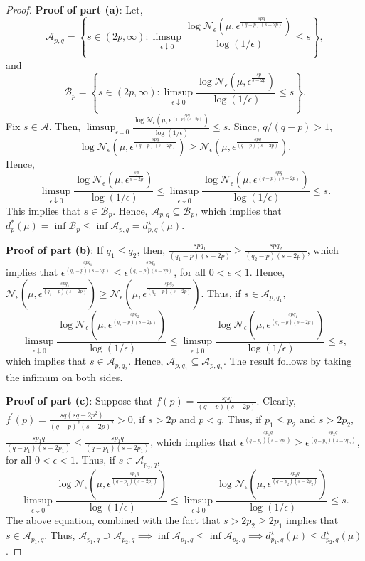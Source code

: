\documentclass[12pts]{article}
\newcommand{\sA}{ \mathscr{A}}
\newcommand{\sB}{ \mathscr{B}}
\newcommand{\sN}{ \mathscr{N}}
\begin{document}
 \begin{proof}
     \textbf{Proof of part (a)}: Let,  \[\sA_{p,q}=  \left\{s \in (2p, \infty) : \limsup_{\epsilon \downarrow 0} \frac{\log \sN_{\epsilon}\left(\mu, \epsilon^{\frac{s p q}{(q-p)(s-2p)}}\right)}{\log(1/\epsilon)} \leq s \right\},\] 
     and \[\sB_{p}=  \left\{s \in (2p, \infty) : \limsup_{\epsilon \downarrow 0} \frac{\log \sN_{\epsilon}\left(\mu, \epsilon^{\frac{s p }{s-2p}}\right)}{\log(1/\epsilon)} \leq s \right\}.\] Fix $s \in \sA$. Then,  $\limsup_{\epsilon \downarrow 0} \frac{\log \sN_{\epsilon}\left(\mu, \epsilon^{\frac{s p q}{(q-p)(s-2p)}}\right)}{\log(1/\epsilon)} \leq s$. Since, $q/(q-p) > 1$, 
     \[\log \sN_{\epsilon}\left(\mu, \epsilon^{\frac{s p q}{(q-p)(s-2p)}}\right) \ge \sN_{\epsilon}\left(\mu, \epsilon^{\frac{s p q}{(q-p)(s-2p)}}\right).\]
     Hence, \[\limsup_{\epsilon \downarrow 0} \frac{\log \sN_{\epsilon}\left(\mu, \epsilon^{\frac{s p }{s-2p}}\right)}{\log(1/\epsilon)} \le \limsup_{\epsilon \downarrow 0} \frac{\log \sN_{\epsilon}\left(\mu, \epsilon^{\frac{s p q}{(q-p)(s-2p)}}\right)}{\log(1/\epsilon)}  \leq s. \]
     This implies that $s \in \sB_p$. Hence, $\sA_{p,q} \subseteq \sB_p$, which implies that $d^\ast_p(\mu) = \inf \sB_p \le \inf \sA_{p,q} = d^\star_{p,q}(\mu)$. 

\textbf{Proof of part (b)}: If $q_1 \le q_2$, then, $\frac{s p q_1}{(q_1-p)(s - 2 p)} \ge \frac{s p q_2}{(q_2-p)(s - 2 p)}$, which implies that $\epsilon^{\frac{s p q_1}{(q_1-p)(s - 2 p)}} \le \epsilon^{\frac{s p q_2}{(q_2-p)(s - 2 p)}}$, for all $0 < \epsilon < 1$. Hence, $\sN_{\epsilon}\left(\mu, \epsilon^{\frac{s p q_1}{(q_1-p)(s-2p)}}\right) \ge \sN_{\epsilon}\left(\mu, \epsilon^{\frac{s p q_2}{(q_2-p)(s-2p)}}\right)$. Thus, if $s \in \sA_{p,q_1}$, 
\[\limsup_{\epsilon \downarrow 0} \frac{\log \sN_{\epsilon}\left(\mu, \epsilon^{\frac{s p q_2}{(q_2-p)(s-2p)}}\right)}{\log(1/\epsilon)} \le  \limsup_{\epsilon \downarrow 0} \frac{\log \sN_{\epsilon}\left(\mu, \epsilon^{\frac{s p q_1}{(q_1-p)(s-2p)}}\right)}{\log(1/\epsilon)} \leq s, \]
which implies that $s \in \sA_{p, q_2}$. Hence, $\sA_{p, q_1} \subseteq \sA_{p, q_2} $. The result follows by taking the infimum on both sides. 

\textbf{Proof of part (c)}:
Suppose that $f(p) = \frac{spq}{\left(q-p\right)\left(s-2p\right)}.$ Clearly, $f^\prime(p) = \frac{sq(sq - 2 p^2)}{(q-p)^2 (s-2p)^2} > 0$, if $s > 2p $ and $p <q $. Thus, if $p_1 \le p_2$ and $s > 2p_2$, $\frac{s p_1 q }{(q-p_1)(s - 2 p_1)} \le \frac{s p_1 q}{(q-p_1)(s - 2 p_1)}$, which implies that $\epsilon^{\frac{s p_1 q}{(q-p_1)(s - 2 p_1)}} \ge \epsilon^{\frac{s p_2 q}{(q-p_2)(s - 2 p_2)}}$, for all $0 < \epsilon < 1$. Thus, if $s \in \sA_{p_2, q}$, 
\[\limsup_{\epsilon \downarrow 0} \frac{\log \sN_{\epsilon}\left(\mu, \epsilon^{\frac{s p_1 q}{(q-p_1)(s-2p_1)}}\right)}{\log(1/\epsilon)} \le \limsup_{\epsilon \downarrow 0} \frac{\log \sN_{\epsilon}\left(\mu, \epsilon^{\frac{s p_2 q}{(q-p_2)(s-2p_2)}}\right)}{\log(1/\epsilon)} \le s.\]
The above equation, combined with the fact that $s > 2 p_2 \ge 2 p_1$ implies that $s \in \sA_{p_1, q}$. Thus, $\sA_{p_1, q} \supseteq \sA_{p_2, q} \implies \inf \sA_{p_1, q} \le  \inf \sA_{p_2, q} \implies d^\star_{p_1, q}(\mu) \le d^\star_{p_2,q} (\mu)$.


\end{proof}
\end{document}
